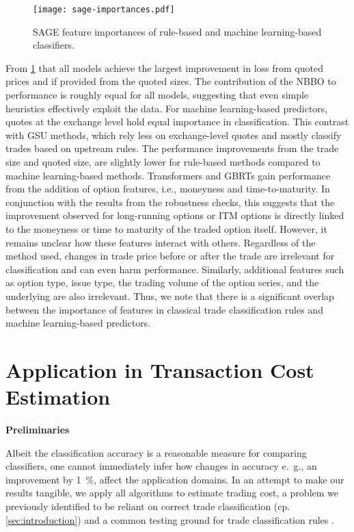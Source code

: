 \begin{figure}[h!]
    \centering
    \texttt{[image: sage-importances.pdf]}
    \caption[ Feature Importances For Classifiers]{\gls{SAGE} feature importances of rule-based and machine learning-based classifiers.}
    \label{fig:sage-importances}
\end{figure}

From \cref{fig:sage-importances} that all models achieve the largest improvement in loss from quoted prices and if provided from the quoted sizes. The contribution of the \gls{NBBO} to performance is roughly equal for all models, suggesting that even simple heuristics effectively exploit the data. For machine learning-based predictors, quotes at the exchange level hold equal importance in classification. This contrast with \gls{GSU} methods, which rely less on exchange-level quotes and mostly classify trades based on upstream rules. The performance improvements from the trade size and quoted size, are slightly lower for rule-based methods compared to machine learning-based methods.  Transformers and \glspl{GBRT} gain performance from the addition of option features, i.e., moneyness and time-to-maturity. In conjunction with the results from the robustness checks, this suggests that the improvement observed for long-running options or \gls{ITM} options is directly linked to the moneyness or time to maturity of the traded option itself. However, it remains unclear how these features interact with others. Regardless of the method used, changes in trade price before or after the trade are irrelevant for classification and can even harm performance. Similarly, additional features such as option type, issue type, the trading volume of the option series, and the underlying are also irrelevant. Thus, we note that there is a significant overlap between the importance of features in classical trade classification rules and machine learning-based predictors.


\clearpage

\section{Application in Transaction Cost Estimation}\label{sec:application}

\textbf{Preliminaries}

Albeit the classification accuracy is a reasonable measure for comparing classifiers, one cannot immediately infer how changes in accuracy e.~g., an improvement by \SI{1}{\percent}, affect the application domains. In an attempt to make our results tangible, we apply all algorithms to estimate trading cost, a problem we previously identified to be reliant on correct trade classification (cp. \cref{sec:introduction}) and a common testing ground for trade classification rules \autocites[cp.][541]{ellisAccuracyTradeClassification2000}[][569]{finucaneDirectTestMethods2000}[][271--278]{petersonEvaluationBiasesExecution2003}[][896--897]{savickasInferringDirectionOption2003}.

